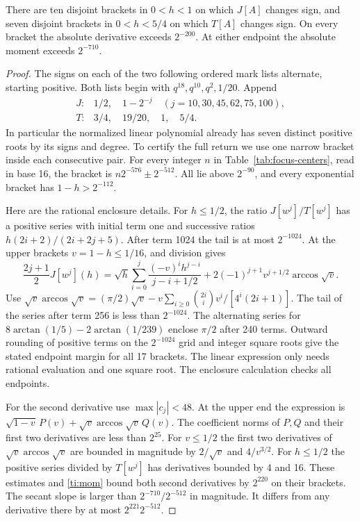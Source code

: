 \begin{lemma}\label{ti:signs}
There are ten disjoint brackets in $0<h<1$ on which $J[A]$ changes sign,
and seven disjoint brackets in $0<h<5/4$ on which $T[A]$ changes sign.
On every bracket the absolute derivative exceeds $2^{-200}$.
At either endpoint the absolute moment exceeds $2^{-710}$.
\end{lemma}
\begin{proof}
The signs on each of the two following ordered mark lists alternate,
starting positive. Both lists begin with
$q^{18},q^{10},q^2,1/20$. Append
\[
\begin{array}{ll}
 J:&1/2,\quad 1-2^{-j}\quad (j=10,30,45,62,75,100),\\
 T:&3/4,\quad 19/20,\quad 1,\quad 5/4 .
\end{array}
\]
In particular the normalized linear polynomial already has seven distinct
positive roots by its signs and degree. To certify the full return we
use one narrow bracket inside each consecutive pair. For every integer
$n$ in Table~\ref{tab:focus-centers}, read in base 16, the bracket is
$n2^{-576}\pm2^{-512}$. All lie above $2^{-90}$, and every exponential
bracket has $1-h>2^{-112}$.

Here are the rational enclosure details. For $h\le1/2$, the ratio
$J[w^j]/T[w^j]$ has a positive series with initial term one and
successive ratios $h(2i+2)/(2i+2j+5)$. After term 1024 the tail is
at most $2^{-1024}$. At the upper brackets $v=1-h\le1/16$, and division gives
\[
 \frac{2j+1}{2}J[w^j](h)=
 \sqrt h\sum_{i=0}^j\frac{(-v)^i h^{j-i}}{j-i+1/2}
       +2(-1)^{j+1}v^{j+1/2}\arccos\sqrt v .
\]
Use $\sqrt v\arccos\sqrt v=(\pi/2)\sqrt v-v\sum_{i\ge0}
\binom{2i}i v^i/[4^i(2i+1)]$. The tail of the series after term 256 is
less than $2^{-1024}$. The alternating series for
$8\arctan(1/5)-2\arctan(1/239)$ enclose $\pi/2$ after 240 terms.
Outward rounding of positive terms on the $2^{-1024}$ grid and integer
square roots give the stated endpoint margin for all 17 brackets.
The linear expression only needs rational evaluation and one square root.
The enclosure calculation checks all endpoints.

For the second derivative use $\max|c_j|<48$. At the upper end the
expression is $\sqrt{1-v}\,P(v)+\sqrt v\arccos\sqrt v\,Q(v)$.
The coefficient norms of $P,Q$ and their first two derivatives are
less than $2^{25}$. For $v\le1/2$ the first two derivatives of
$\sqrt v\arccos\sqrt v$ are bounded in magnitude by $2/\sqrt v$ and
$4/v^{3/2}$. For $h\le1/2$ the positive series divided by $T[w^j]$
has derivatives bounded by 4 and 16. These estimates and \eqref{ti:mom}
bound both second derivatives by $2^{220}$ on their brackets.
The secant slope is larger than $2^{-710}/2^{-512}$ in magnitude.
It differs from any derivative there by at most $2^{221}2^{-512}$.
\end{proof}


